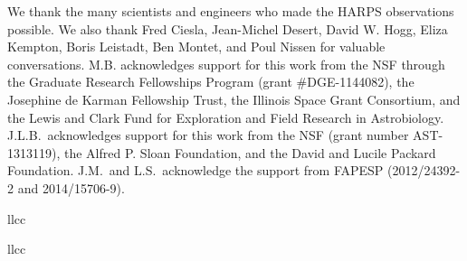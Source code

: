 \documentclass[twocolumn]{aastex62}
\newcommand{\acronym}[1]{{\small{#1}}}
\begin{document}
\acknowledgements
We thank the many scientists and engineers who made the \acronym{HARPS} observations possible. We also thank Fred Ciesla, Jean-Michel Desert, David W. Hogg, Eliza Kempton, Boris Leistadt, Ben Montet, and Poul Nissen for valuable conversations.  M.B. acknowledges support for this work from the \acronym{NSF} through the Graduate Research Fellowships Program (grant \#DGE-1144082), the Josephine de Karman Fellowship Trust, the Illinois Space Grant Consortium, and the Lewis and Clark Fund for Exploration and Field Research in Astrobiology. J.L.B.\ acknowledges support for this work from the NSF (grant number AST-1313119), the Alfred P. Sloan Foundation, and the David and Lucile Packard Foundation. J.M.\ and L.S.\ acknowledge the support from \acronym{FAPESP} (2012/24392-2 and 2014/15706-9).






\newpage

\startlongtable
\begin{deluxetable*}{llcc}
\tabletypesize{\small}
\startdata

\enddata
{}
\end{deluxetable*}

\pagebreak

\startlongtable
\begin{deluxetable*}{llcc}
\tabletypesize{\small}
\startdata

\enddata
{}
\end{deluxetable*}
\end{document}

